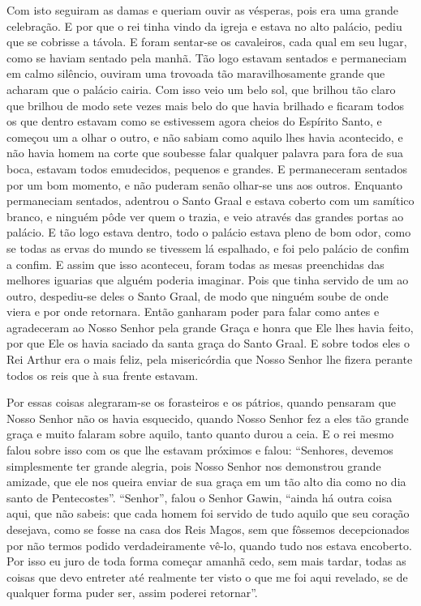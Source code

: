 Com isto seguiram as damas e queriam ouvir as vésperas, pois era uma grande
celebração. E por que o rei tinha vindo da igreja e estava no alto palácio,
pediu que se cobrisse a távola. E foram sentar-se os cavaleiros, cada qual em
seu lugar, como se haviam sentado pela manhã. Tão logo estavam sentados e
permaneciam em calmo silêncio, ouviram uma trovoada tão maravilhosamente grande
que acharam que o palácio cairia. Com isso veio um belo sol, que brilhou tão
claro que brilhou de modo sete vezes mais belo do que havia brilhado e ficaram
todos os que dentro estavam como se estivessem agora cheios do Espírito Santo,
e começou um a olhar o outro, e não sabiam como aquilo lhes havia acontecido, e
não havia homem na corte que soubesse falar qualquer palavra para fora de sua
boca, estavam todos emudecidos, pequenos e grandes. E permaneceram sentados por
um bom momento, e não puderam senão olhar-se uns aos outros. Enquanto
permaneciam sentados, adentrou o Santo Graal e estava coberto com um samítico
branco, e ninguém pôde ver quem o trazia, e veio através das grandes portas ao
palácio. E tão logo estava dentro, todo o palácio estava pleno de bom odor,
como se todas as ervas do mundo se tivessem lá espalhado, e foi pelo palácio de
confim a confim. E assim que isso aconteceu, foram todas as mesas preenchidas
das melhores iguarias que alguém poderia imaginar. Pois que tinha servido de um
ao outro, despediu-se deles o Santo Graal, de modo que ninguém soube de onde
viera e por onde retornara. Então ganharam poder para falar como antes e
agradeceram ao Nosso Senhor pela grande Graça e honra que Ele lhes havia feito,
por que Ele os havia saciado da santa graça do Santo Graal. E sobre todos eles
o Rei Arthur era o mais feliz, pela misericórdia que Nosso Senhor lhe fizera
perante todos os reis que à sua frente estavam. 

Por essas coisas alegraram-se os forasteiros e os pátrios, quando pensaram que
Nosso Senhor não os havia esquecido, quando Nosso Senhor fez a eles tão grande
graça e muito falaram sobre aquilo, tanto quanto durou a ceia. E o rei mesmo
falou sobre isso com os que lhe estavam próximos e falou: “Senhores, devemos
simplesmente ter grande alegria, pois Nosso Senhor nos demonstrou grande
amizade, que ele nos queira enviar de sua graça em um tão alto dia como no dia
santo de Pentecostes”. “Senhor”, falou o Senhor Gawin, “ainda há outra coisa
aqui, que não sabeis: que cada homem foi servido de tudo aquilo que seu coração
desejava, como se fosse na casa dos Reis Magos, sem que fôssemos decepcionados
por não termos podido verdadeiramente vê-lo, quando tudo nos estava encoberto.
Por isso eu juro de toda forma começar amanhã cedo, sem mais tardar, todas as
coisas que devo entreter até realmente ter visto o que me foi aqui revelado, se
de qualquer forma puder ser, assim poderei retornar”. 

